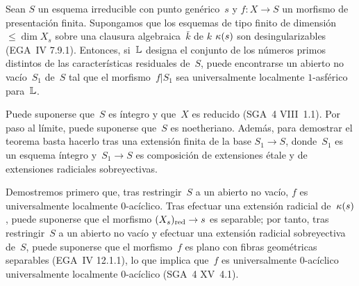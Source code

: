 \shorthandoff{<>}%

\begin{theoreme}
\label{XIII.3.3}
Sean $S$ un esquema irreducible con punto genérico~$s$ y
$f\colon X\to S$ un morfismo de presentación finita. Supongamos que los
esquemas de tipo finito de dimensión $\leqslant\dim X_s$ sobre una clausura
algebraica~$\bar{k}$ de
{$k$}
{$\kappa(s)$}
son desingularizables \textup{(EGA~IV 7.9.1)}. Entonces, si~$\mathbb L$ designa
el conjunto de los números primos distintos de las características
residuales de~$S$, puede encontrarse un abierto no vacío~$S_1$ de~$S$ tal
que el morfismo~$f|S_1$ sea universalmente localmente $1$-asférico
para~$\mathbb L$.
\end{theoreme}

Puede suponerse que~$S$ es íntegro y que~$X$ es reducido (SGA~4 VIII~1.1).
Por paso al límite, puede suponerse que~$S$ es noetheriano. Además, para
demostrar el teorema basta hacerlo tras una extensión finita de la base
$S_1\to S$, donde~$S_1$ es un esquema íntegro y~$S_1\to S$ es composición
de extensiones étale y de extensiones radiciales sobreyectivas.

Demostremos primero que, tras restringir~$S$ a un abierto no vacío, $f$ es
universalmente localmente $0$-acíclico. Tras efectuar una extensión
radicial de~$\kappa(s)$, puede suponerse que el morfismo
$(X_s)_{\mathrm{red}}\to s$ es separable; por tanto, tras restringir~$S$ a un abierto
no vacío y efectuar una extensión radicial sobreyectiva de~$S$, puede
suponerse que el morfismo~$f$ es plano con fibras geométricas separables
(EGA~IV 12.1.1), lo que implica que~$f$ es
{universalmente $0$-acíclico}
{universalmente localmente $0$-acíclico}
(SGA~4 XV~4.1).


